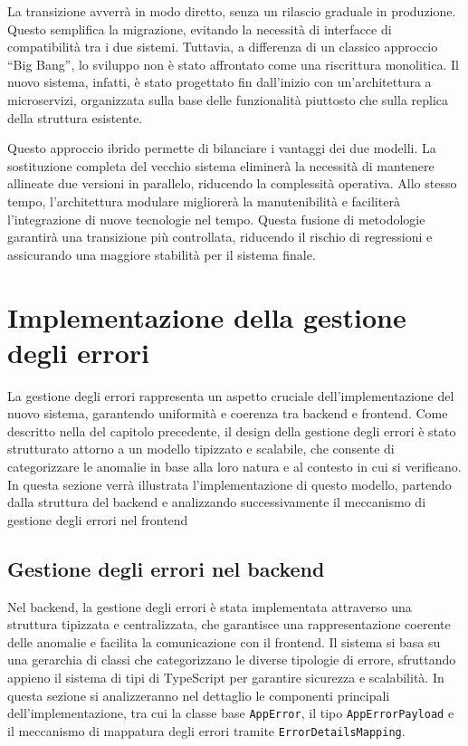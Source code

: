 La transizione avverrà in modo diretto, senza un rilascio graduale in produzione. Questo semplifica la migrazione, evitando la necessità di interfacce di compatibilità tra i due sistemi. Tuttavia, a differenza di un classico approccio ``Big Bang'', lo sviluppo non è stato affrontato come una riscrittura monolitica. Il nuovo sistema, infatti, è stato progettato fin dall'inizio con un'architettura a microservizi, organizzata sulla base delle funzionalità piuttosto che sulla replica della struttura esistente.

Questo approccio ibrido permette di bilanciare i vantaggi dei due modelli. La sostituzione completa del vecchio sistema eliminerà la necessità di mantenere allineate due versioni in parallelo, riducendo la complessità operativa. Allo stesso tempo, l'architettura modulare migliorerà la manutenibilità e faciliterà l'integrazione di nuove tecnologie nel tempo. Questa fusione di metodologie garantirà una transizione più controllata, riducendo il rischio di regressioni e assicurando una maggiore stabilità per il sistema finale.

\section{Implementazione della gestione degli errori}
La gestione degli errori rappresenta un aspetto cruciale dell’implementazione del nuovo sistema, garantendo uniformità e coerenza tra backend e frontend. Come descritto nella  del capitolo precedente, il design della gestione degli errori è stato strutturato attorno a un modello tipizzato e scalabile, che consente di categorizzare le anomalie in base alla loro natura e al contesto in cui si verificano. In questa sezione verrà illustrata l'implementazione di questo modello, partendo dalla struttura del backend e analizzando successivamente il meccanismo di gestione degli errori nel frontend

\subsection{Gestione degli errori nel backend}
Nel backend, la gestione degli errori è stata implementata attraverso una struttura tipizzata e centralizzata, che garantisce una rappresentazione coerente delle anomalie e facilita la comunicazione con il frontend. Il sistema si basa su una gerarchia di classi che categorizzano le diverse tipologie di errore, sfruttando appieno il sistema di tipi di TypeScript per garantire sicurezza e scalabilità. In questa sezione si analizzeranno nel dettaglio le componenti principali dell’implementazione, tra cui la classe base \texttt{AppError}, il tipo \texttt{AppErrorPayload} e il meccanismo di mappatura degli errori tramite \texttt{ErrorDetailsMapping}.

